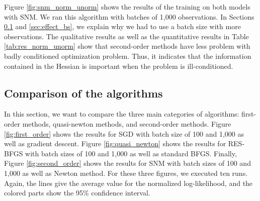 \documentclass[conference]{IEEEtran}
\begin{document}
Figure \ref{fig:snm_norm_unorm} shows the results of the training on both models with SNM. We ran this algorithm with batches of 1,000 observations. In Sections \ref{sec:comp_algo} and \ref{sec:effect_bs}, we explain why we had to use a batch size with more observations. The qualitative results as well as the quantitative results in Table \ref{tab:res_norm_unorm} show that second-order methods have less problem with badly conditioned optimization problem. Thus, it indicates that the information contained in the Hessian is important when the problem is ill-conditioned.

\subsection{Comparison of the algorithms}
\label{sec:comp_algo}

In this section, we want to compare the three main categories of algorithms: first-order methods, quasi-newton methods, and second-order methods. Figure \ref{fig:first_order} shows the results for SGD with batch size of 100 and 1,000 as well as gradient descent. Figure \ref{fig:quasi_newton} shows the results for RES-BFGS with batch sizes of 100 and 1,000 as well as standard BFGS. Finally,  Figure \ref{fig:second_order} shows the results for SNM with batch sizes of 100 and 1,000 as well as Newton method. For these three figures, we executed ten runs. Again, the lines give the average value for the normalized log-likelihood, and the colored parts show the 95\% confidence interval.\\
\end{document}
